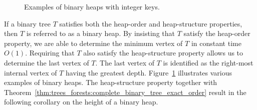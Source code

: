 \begin{figure}[!htbp]
\centering
{}
\caption{Examples of binary heaps with integer keys.}
\label{fig:tree_data_structures:binary_heaps_integer_keys}
\end{figure}

If a binary tree $T$ satisfies both the heap-order and heap-structure
properties, then $T$ is referred to as a binary heap. By insisting
that $T$ satisfy the heap-order property,
we are able to determine the minimum vertex of $T$ in constant time
$O(1)$. Requiring that $T$ also satisfy the
heap-structure property allows us to
determine the last vertex of $T$. The last vertex of $T$ is identified
as the right-most internal vertex of $T$ having the greatest depth.
Figure~\ref{fig:tree_data_structures:binary_heaps_integer_keys}
illustrates various examples of binary heaps. The heap-structure
property together with
Theorem~\ref{thm:trees_forests:complete_binary_tree_exact_order}
result in the following corollary on the height of a binary heap.

